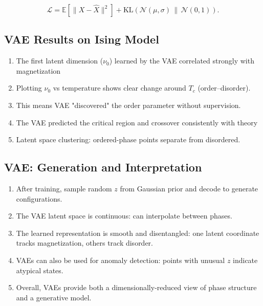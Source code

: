 \documentclass[%
oneside,                 %
final,                   %
10pt]{article}
\begin{document}
\noindent
     \[
       \mathcal{L} = \mathbb{E}[\|X - \hat{X}\|^2] +
       \mathrm{KL}(\mathcal{N}(\mu,\sigma)\,\|\,\mathcal{N}(0,1)).
     \]

\subsection{VAE Results on Ising Model}

\begin{enumerate}
\item The first latent dimension ($\nu_0$) learned by the VAE correlated strongly with magnetization 

\item Plotting $\nu_0$ vs temperature shows clear change around $T_c$ (order–disorder).

\item This means VAE "discovered" the order parameter without supervision.

\item The VAE predicted the critical region and crossover consistently with theory 

\item Latent space clustering: ordered-phase points separate from disordered.
\end{enumerate}

\noindent
\subsection{VAE: Generation and Interpretation}

\begin{enumerate}
\item After training, sample random $z$ from Gaussian prior and decode to generate configurations.

\item The VAE latent space is continuous: can interpolate between phases.

\item The learned representation is smooth and disentangled: one latent coordinate tracks magnetization, others track disorder.

\item VAEs can also be used for anomaly detection: points with unusual $z$ indicate atypical states.

\item Overall, VAEs provide both a dimensionally-reduced view of phase structure and a generative model.
\end{enumerate}
\end{document}
